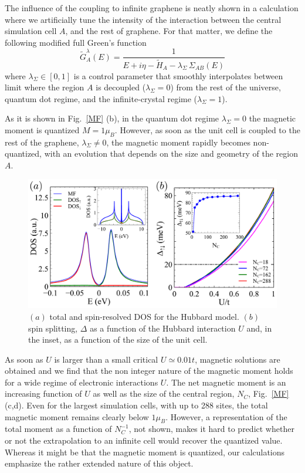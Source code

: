 The influence of the coupling to infinite graphene is neatly shown in a calculation where we artificially tune the intensity of the interaction between the central simulation cell $A$, and the rest of graphene.
For that matter, we define the following modified full Green's function
\begin{equation}
  \widetilde{G}_{A}^\lambda(E) =
  \frac{1}{E+i\eta-\widetilde{H}_{A}-\lambda_\Sigma\,\Sigma_{AB}(E)}
\end{equation}
where $\lambda_\Sigma\in[0,1]$ is a control parameter that smoothly interpolates
between limit where the region $A$ is decoupled ($\lambda_\Sigma = 0$) from the rest of the universe, quantum dot regime, and the infinite-crystal regime
($\lambda_\Sigma = 1$).

As it is shown in Fig.~\ref{MF} (b), in the quantum dot regime $\lambda_\Sigma = 0$ the magnetic moment is quantized $M=1\mu_B$. However, as soon as the unit cell is coupled to the rest of the graphene, $\lambda_\Sigma \ne 0$, the magnetic moment rapidly becomes non-quantized, with an evolution that depends on the size and geometry of the region $A$.
\begin{figure}[h!]
\centering
\includegraphics{defects/fig/MFfig2_dos.pdf}
\vspace{-15pt}
\caption{$(a)$ total and spin-resolved DOS for the Hubbard model. $(b)$ spin splitting, $\Delta$ as a function of the Hubbard interaction $U$ and, in the inset, as a function of the size of the unit cell.}
\label{MFdos}
\end{figure}

As soon as $U$ is larger than a small critical $U\simeq 0.01 t$, magnetic solutions are obtained and we find that the non integer nature of the magnetic moment holds for a wide regime of electronic interactions $U$.
The net magnetic moment is an increasing function of $U$ as well as the size of the central region, $N_C$, Fig.~\ref{MF} (c,d). Even for the largest simulation cells, with up to 288 sites, the total magnetic moment remains clearly below $1\mu_B$. However, a representation of the total moment as a function of $N_C^{-1}$, not shown, makes it hard to predict whether or not the extrapolation to an infinite cell would recover the quantized value. Whereas it might be that the magnetic moment is quantized, our calculations emphasize the rather extended nature of this object.

